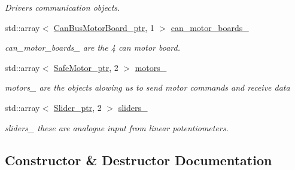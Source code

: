 \begin{DoxyCompactItemize}
\begin{DoxyCompactList}\small\item\em Drivers communication objects. \end{DoxyCompactList}\item 
\mbox{\label{classblmc__robots_1_1SingleLeg_a133902cdf8468f2cf8849fdc6daed312}} 
std\+::array$<$ \hyperlink{common__header_8hpp_aab1c6ddb1273247a1b45d5e8b417c216}{Can\+Bus\+Motor\+Board\+\_\+ptr}, 1 $>$ \hyperlink{classblmc__robots_1_1SingleLeg_a133902cdf8468f2cf8849fdc6daed312}{can\+\_\+motor\+\_\+boards\+\_\+}
\begin{DoxyCompactList}\small\item\em can\+\_\+motor\+\_\+boards\+\_\+ are the 4 can motor board. \end{DoxyCompactList}\item 
\mbox{\label{classblmc__robots_1_1SingleLeg_ac2964b955b883496833cd5d00ab2b1c7}} 
std\+::array$<$ \hyperlink{common__header_8hpp_a9850cf917156e20846aef3f8195aea0f}{Safe\+Motor\+\_\+ptr}, 2 $>$ \hyperlink{classblmc__robots_1_1SingleLeg_ac2964b955b883496833cd5d00ab2b1c7}{motors\+\_\+}
\begin{DoxyCompactList}\small\item\em motors\+\_\+ are the objects alowing us to send motor commands and receive data \end{DoxyCompactList}\item 
\mbox{\label{classblmc__robots_1_1SingleLeg_a009823b7c3e817eabb6e572406460d2f}} 
std\+::array$<$ \hyperlink{common__header_8hpp_a4cb9a95e8b2c0bf237ce29f5252c7b73}{Slider\+\_\+ptr}, 2 $>$ \hyperlink{classblmc__robots_1_1SingleLeg_a009823b7c3e817eabb6e572406460d2f}{sliders\+\_\+}
\begin{DoxyCompactList}\small\item\em sliders\+\_\+ these are analogue input from linear potentiometers. \end{DoxyCompactList}\end{DoxyCompactItemize}


\subsection{Constructor \& Destructor Documentation}
\mbox{\label{classblmc__robots_1_1SingleLeg_a1b1ef6964010aa2042b042ff3d5d864f}} 
